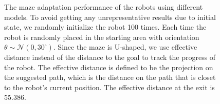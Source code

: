 \begin{figure}[!t]
\centering
{}
{}
\vfil
{}
{}
\caption{The maze adaptation performance of the robots using different models.
To avoid getting any unrepresentative results due to initial state, we randomly initialize the robot 100 times.
Each time the robot is randomly placed in the starting area with orientation $\theta \sim \mathcal{N}(0, 30^{\circ})$.
Since the maze is U-shaped, we use effective distance instead of the distance to the goal to track the progress of the robot.
The effective distance is defined to be the projection on the suggested path, which is the distance on the path that is closet to the robot's current position.
The effective distance at the exit is 55.386.
}
\label{navigation_results}
\end{figure}


